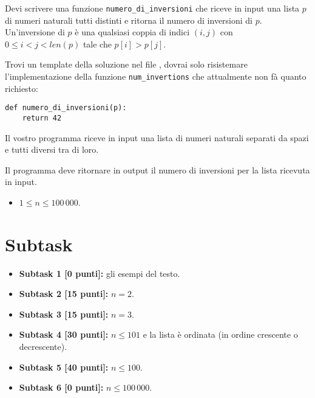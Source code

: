 \renewcommand{\nomebreve}{conta\_inversioni}
\renewcommand{\titolo}{Numero di Inversioni}

\introduzione{}

Devi scrivere una funzione {\tt numero\_di\_inversioni} che riceve in input una lista $p$ di numeri naturali tutti distinti e ritorna il numero di inversioni di $p$. Un'inversione di $p$ è una qualsiasi coppia di indici $(i,j)$ con $0\leq i < j < len(p)$ tale che $p[i] > p[j]$.

Trovi un template della soluzione nel file \textbf{}, dovrai solo risistemare l'implementazione della funzione {\tt num\_invertions} che attualmente non fà quanto richiesto: 

\begin{verbatim}
def numero_di_inversioni(p):
    return 42
\end{verbatim}


Il vostro programma riceve in input una lista di numeri naturali separati da spazi e tutti diversi tra di loro.


Il programma deve ritornare in output il numero di inversioni per la lista ricevuta in input.




\begin{itemize}[nolistsep, noitemsep]
  \item $1 \le n \le 100\,000$.
\end{itemize}

  \section*{Subtask}
  \begin{itemize}
    \item \textbf{Subtask 1 [0 punti]:} gli esempi del testo.
    \item \textbf{Subtask 2 [15 punti]:} $n=2$.
    \item \textbf{Subtask 3 [15 punti]:} $n=3$.
    \item \textbf{Subtask 4 [30 punti]:} $n\leq 101$ e la lista è ordinata (in ordine crescente o decrescente).
    \item \textbf{Subtask 5 [40 punti]:} $n \leq 100$.
    \item \textbf{Subtask 6 [0 punti]:} $n \leq 100\,000$.
  \end{itemize}
  
